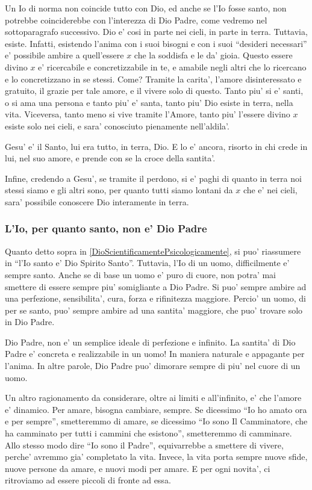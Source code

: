Un Io di norma non coincide tutto con Dio, ed anche se l'Io fosse santo, non potrebbe coinciderebbe con l'interezza di Dio Padre, come vedremo nel sottoparagrafo successivo. Dio e' cosi in parte nei cieli, in parte in terra. Tuttavia, esiste. Infatti, esistendo l'anima con i suoi bisogni e con i suoi ``desideri necessari'' e' possibile ambire a quell'essere $x$ che la soddisfa e le da' gioia. Questo essere divino $x$ e' ricercabile e concretizzabile in te, e amabile negli altri che lo ricercano e lo concretizzano in se stessi. Come? Tramite la carita',  l'amore disinteressato e gratuito, il grazie per tale amore, e il vivere solo di questo. Tanto piu' si e' santi, o si ama una persona e tanto piu' e' santa, tanto piu' Dio esiste in terra, nella vita. Viceversa, tanto meno si vive tramite l'Amore, tanto piu' l'essere divino $x$ esiste solo nei cieli, e sara' conosciuto pienamente nell'aldila'. 

Gesu' e' il Santo, lui era tutto, in terra, Dio. E lo e' ancora, risorto in chi crede in lui, nel suo amore, e prende con se la croce della santita'.

Infine, credendo a Gesu', se tramite il perdono, si e' paghi di quanto in terra noi stessi siamo e gli altri sono, per quanto tutti siamo lontani da $x$ che e' nei cieli, sara' possibile conoscere Dio interamente in terra.

\subsubsection{L'Io, per quanto santo, non e' Dio Padre}

Quanto detto sopra in \ref{DioScientificamentePsicologicamente}, si puo' riassumere in ``l'Io santo e' Dio Spirito Santo''. Tuttavia, l'Io di un uomo, difficilmente e' sempre santo. Anche se di base un uomo e' puro di cuore, non potra' mai smettere di essere sempre piu' somigliante a Dio Padre. Si puo' sempre ambire ad una perfezione, sensibilita', cura, forza e rifinitezza maggiore. Percio' un uomo, di per se santo, puo' sempre ambire ad una santita' maggiore, che puo' trovare solo in Dio Padre. 

Dio Padre, non e' un semplice ideale di perfezione e infinito. La santita' di Dio Padre e' concreta e realizzabile in un uomo! In maniera naturale e appagante per l'anima. In altre parole, Dio Padre puo' dimorare sempre di piu' nel cuore di un uomo.

Un altro ragionamento da considerare, oltre ai limiti e all'infinito, e' che l'amore e' dinamico. Per amare, bisogna cambiare, sempre. Se dicessimo ``Io ho amato ora e per sempre'', smetteremmo di amare, se dicessimo ``Io sono Il Camminatore, che ha camminato per tutti i cammini che esistono'', smetteremmo di camminare. Allo stesso modo dire ``Io sono il Padre'', equivarrebbe a smettere di vivere, perche' avremmo gia' completato la vita. Invece, la vita porta sempre nuove sfide, nuove persone da amare, e nuovi modi per amare. E per ogni novita', ci ritroviamo ad essere piccoli di fronte ad essa.

